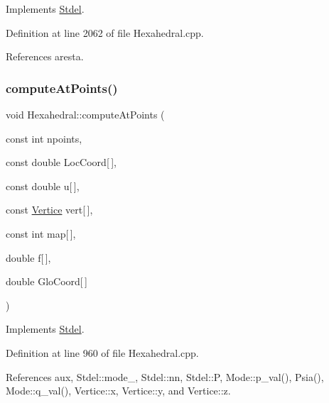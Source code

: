 Implements \hyperlink{classStdel_a69b8ef7def7891fcb2d5d8fd9b75bdc8}{Stdel}.



Definition at line 2062 of file Hexahedral.\+cpp.



References aresta.

\mbox{\label{classHexahedral_a49a57b40396ae96449b3a2aa765b1e8b}} 
\subsubsection{\texorpdfstring{compute\+At\+Points()}{computeAtPoints()}}
{\footnotesize\ttfamily void Hexahedral\+::compute\+At\+Points (\begin{DoxyParamCaption}\item[{const int}]{npoints,  }\item[{const double}]{Loc\+Coord\mbox{[}$\,$\mbox{]},  }\item[{const double}]{u\mbox{[}$\,$\mbox{]},  }\item[{const \hyperlink{structVertice}{Vertice}}]{vert\mbox{[}$\,$\mbox{]},  }\item[{const int}]{map\mbox{[}$\,$\mbox{]},  }\item[{double}]{f\mbox{[}$\,$\mbox{]},  }\item[{double}]{Glo\+Coord\mbox{[}$\,$\mbox{]} }\end{DoxyParamCaption})\hspace{0.3cm}{\ttfamily [virtual]}}



Implements \hyperlink{classStdel_a03e038055d238608efce470629863c36}{Stdel}.



Definition at line 960 of file Hexahedral.\+cpp.



References aux, Stdel\+::mode\+\_\+, Stdel\+::nn, Stdel\+::P, Mode\+::p\+\_\+val(), Psia(), Mode\+::q\+\_\+val(), Vertice\+::x, Vertice\+::y, and Vertice\+::z.

